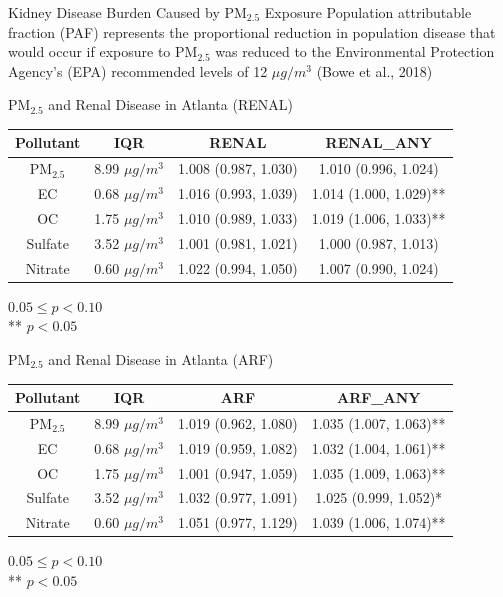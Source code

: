 \documentclass[handout]{beamer} %
\begin{document}
\begin{frame}{Kidney Disease Burden Caused by PM$_{2.5}$ Exposure}
    Population attributable fraction (PAF) represents the proportional reduction in population disease that would occur if exposure to PM$_{2.5}$ was reduced to the Environmental Protection Agency's (EPA) recommended levels of 12 $\mu g/m^3$ (Bowe et al., 2018)
\end{frame}

\begin{frame}{PM$_{2.5}$ and Renal Disease in Atlanta (RENAL)}
    \begin{table}
        \small
        \centering
        \begin{tabular}{c|c|c|c}
            \hline
            Pollutant & IQR & RENAL & RENAL\_ANY \\
            \hline
            PM$_{2.5}$ & 8.99 $\mu g/m^3$ & 1.008 (0.987, 1.030) & 1.010 (0.996, 1.024) \\
            EC & 0.68 $\mu g/m^3$ & 1.016 (0.993, 1.039) & 1.014 (1.000, 1.029)** \\
            OC & 1.75 $\mu g/m^3$ & 1.010 (0.989, 1.033) & 1.019 (1.006, 1.033)** \\
            Sulfate & 3.52 $\mu g/m^3$ & 1.001 (0.981, 1.021) & 1.000 (0.987, 1.013) \\
            Nitrate & 0.60 $\mu g/m^3$ & 1.022 (0.994, 1.050) & 1.007 (0.990, 1.024) \\
            \hline
        \end{tabular}
    \end{table}
    {\footnotesize * $0.05 \leq p < 0.10$ \\ ** $p < 0.05$}
\end{frame}

\begin{frame}{PM$_{2.5}$ and Renal Disease in Atlanta (ARF)}
    \begin{table}
        \small
        \centering
        \begin{tabular}{c|c|c|c}
            \hline
            Pollutant & IQR & ARF & ARF\_ANY \\
            \hline
            PM$_{2.5}$ & 8.99 $\mu g/m^3$ & 1.019 (0.962, 1.080) & 1.035 (1.007, 1.063)** \\
            EC & 0.68 $\mu g/m^3$ & 1.019 (0.959, 1.082) & 1.032 (1.004, 1.061)** \\
            OC & 1.75 $\mu g/m^3$ & 1.001 (0.947, 1.059) & 1.035 (1.009, 1.063)** \\
            Sulfate & 3.52 $\mu g/m^3$ & 1.032 (0.977, 1.091) & 1.025 (0.999, 1.052)* \\
            Nitrate & 0.60 $\mu g/m^3$ & 1.051 (0.977, 1.129) & 1.039 (1.006, 1.074)** \\
            \hline
        \end{tabular}
    \end{table}
    {\footnotesize * $0.05 \leq p < 0.10$ \\ ** $p < 0.05$}
\end{frame}
\end{document}
